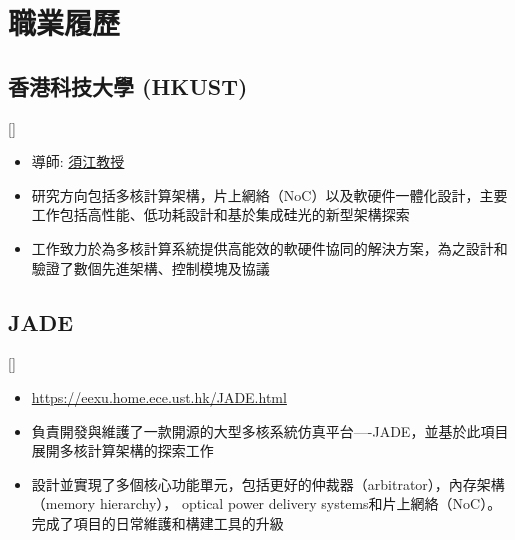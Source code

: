 \documentclass{mycv}
\begin{document}
\maketitle

%
%

\section{職業履歷}

\subsection{香港科技大學 (HKUST)}[]
\begin{positions}
\end{positions}

\begin{itemize}
  \item 導師: \href{https://eexu.home.ece.ust.hk/}{須江教授}
  \item 研究方向包括多核計算架構，片上網絡（NoC）以及軟硬件一體化設計，主要工作包括高性能、低功耗設計和基於集成硅光的新型架構探索
  \item 工作致力於為多核計算系統提供高能效的軟硬件協同的解決方案，為之設計和驗證了數個先進架構、控制模塊及協議
\end{itemize}

\subsection{JADE}[]
\begin{positions}
\end{positions}

\begin{itemize}
  \item \url{https://eexu.home.ece.ust.hk/JADE.html}
  \item 負責開發與維護了一款開源的大型多核系統仿真平台----JADE，並基於此項目展開多核計算架構的探索工作
  \item 設計並實現了多個核心功能單元，包括更好的仲裁器（arbitrator），內存架構（memory hierarchy）， optical power delivery systems和片上網絡（NoC）。完成了項目的日常維護和構建工具的升級
\end{itemize}
\end{document}
